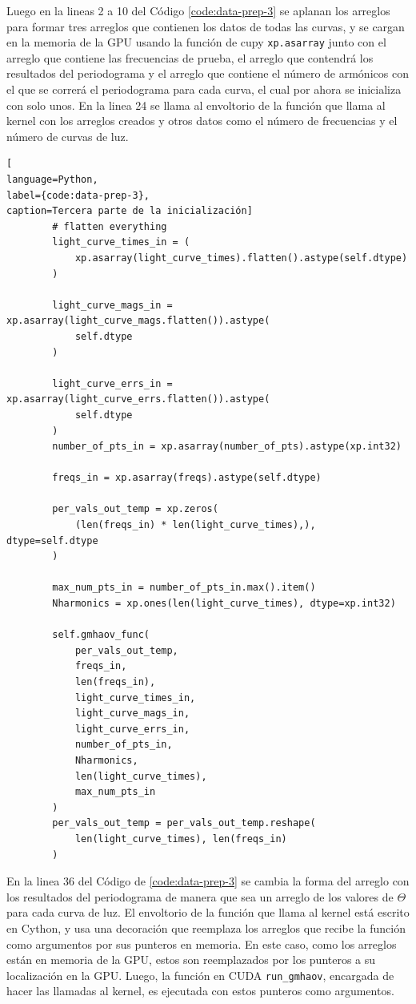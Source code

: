 Luego en la lineas 2 a 10 del Código \ref{code:data-prep-3} se aplanan los arreglos para formar tres arreglos que contienen los datos de todas las curvas, y se cargan en la memoria de la GPU usando la función de cupy \texttt{xp.asarray} junto con el arreglo que contiene las frecuencias de prueba, el arreglo que contendrá los resultados del periodograma y el arreglo que contiene el número de armónicos con el que se correrá el periodograma para cada curva, el cual por ahora se inicializa con solo unos. En la linea 24 se llama al envoltorio de la función que llama al kernel con los arreglos creados y otros datos como el número de frecuencias y el número de curvas de luz.
\begin{lstlisting}[
language=Python,
label={code:data-prep-3},
caption=Tercera parte de la inicialización]
        # flatten everything
        light_curve_times_in = (
            xp.asarray(light_curve_times).flatten().astype(self.dtype)
        )

        light_curve_mags_in = xp.asarray(light_curve_mags.flatten()).astype(
            self.dtype
        )

        light_curve_errs_in = xp.asarray(light_curve_errs.flatten()).astype(
            self.dtype
        )
        number_of_pts_in = xp.asarray(number_of_pts).astype(xp.int32)

        freqs_in = xp.asarray(freqs).astype(self.dtype)

        per_vals_out_temp = xp.zeros(
            (len(freqs_in) * len(light_curve_times),), dtype=self.dtype
        )

        max_num_pts_in = number_of_pts_in.max().item()
        Nharmonics = xp.ones(len(light_curve_times), dtype=xp.int32)

        self.gmhaov_func(
            per_vals_out_temp,
            freqs_in,
            len(freqs_in),
            light_curve_times_in,
            light_curve_mags_in,
            light_curve_errs_in,
            number_of_pts_in,
            Nharmonics,
            len(light_curve_times),
            max_num_pts_in
        )
        per_vals_out_temp = per_vals_out_temp.reshape(
            len(light_curve_times), len(freqs_in)
        )
\end{lstlisting}
En la linea 36 del Código de \ref{code:data-prep-3} se cambia la forma del arreglo con los resultados del periodograma de manera que sea un arreglo de los valores de $\Theta$ para cada curva de luz.
El envoltorio de la función que llama al kernel está escrito en Cython, y usa una decoración que reemplaza los arreglos que recibe la función como argumentos por sus punteros en memoria. En este caso, como los arreglos están en memoria de la GPU, estos son reemplazados por los punteros a su localización en la GPU. Luego, la función en CUDA \texttt{run\_gmhaov}, encargada de hacer las llamadas al kernel, es ejecutada con estos punteros como argumentos.
